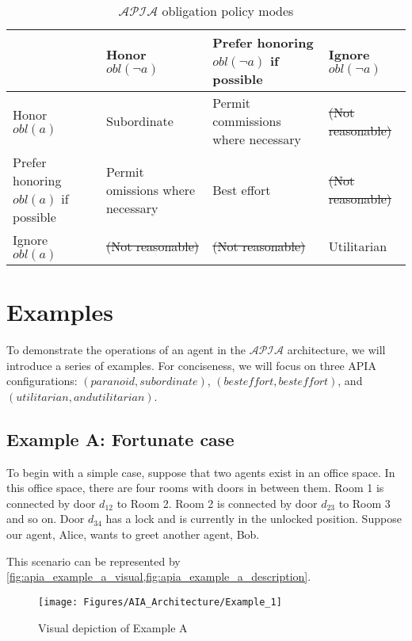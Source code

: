 \begin{table}[h]
    \centering
    \begin{tabularx}{\textwidth}{ | X | X | X | X | }
        \hline
        & Honor $obl(\neg a)$ & Prefer honoring $obl(\neg a)$ if possible & Ignore $obl(\neg a)$ \\
        \hline
        Honor $obl(a)$ & Subordinate & Permit commissions where necessary & \sout{(Not reasonable)} \\
        \hline
        Prefer honoring $obl(a)$ if possible & Permit omissions where necessary & Best effort & \sout{(Not reasonable)} \\
        \hline
        Ignore $obl(a)$ & \sout{(Not reasonable)} & \sout{(Not reasonable)} & Utilitarian \\
        \hline
    \end{tabularx}
    \caption{$\mathcal{APIA}$ obligation policy modes}
    \label{table:apia_obligation_modes}
\end{table}

\section{Examples}

To demonstrate the operations of an agent in the $\mathcal{APIA}$ architecture, we will introduce a series of examples.
For conciseness, we will focus on three APIA configurations: $(paranoid, subordinate)$, $(best effort, best effort)$, and $(utilitarian, and utilitarian)$.

\subsection{Example A: Fortunate case}

To begin with a simple case, suppose that two agents exist in an office space.
In this office space, there are four rooms with doors in between them.
Room 1 is connected by door $d_{12}$ to Room 2.
Room 2 is connected by door $d_{23}$ to Room 3 and so on.
Door $d_{34}$ has a lock and is currently in the unlocked position.
Suppose our agent, Alice, wants to greet another agent, Bob.

This scenario can be represented by \cref{fig:apia_example_a_visual,fig:apia_example_a_description}.

\begin{figure}[h]
    \centering
    \texttt{[image: Figures/AIA\_Architecture/Example\_1]}
    \caption{Visual depiction of Example A}
    \label{fig:apia_example_a_visual}
\end{figure}

